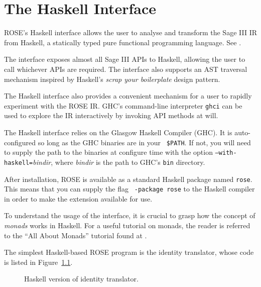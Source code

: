 \chapter{The Haskell Interface}

ROSE's Haskell interface allows the user to analyse and
transform the Sage III IR from Haskell, a statically typed pure
functional programming language.  See .

The interface exposes almost all Sage III APIs to Haskell, allowing
the user to call whichever APIs are required.  The interface also
supports an AST traversal mechanism inspired by Haskell's {\em scrap
your boilerplate} design pattern.

The Haskell interface also provides a convenient mechanism for a
user to rapidly experiment with the ROSE IR.  GHC's command-line
interpreter {\tt ghci} can be used to explore the IR interactively
by invoking API methods at will.

The Haskell interface relies on the Glasgow Haskell Compiler (GHC).
It is auto-configured so long as the GHC binaries are in your {\tt
\$PATH}.  If not, you will need to supply the path to the binaries
at configure time with the option {\tt --with-haskell=}{\em bindir},
where {\em bindir} is the path to GHC's {\tt bin} directory.

After installation, ROSE is available as a standard Haskell package
named {\tt rose}.  This means that you can supply the flag {\tt
-package rose} to the Haskell compiler in order to make the extension
available for use.

To understand the usage of the interface, it is
crucial to grasp how the concept of {\em monads} works
in Haskell.   For a useful tutorial on monads, the reader
is referred to the ``All About Monads'' tutorial found at
.

The simplest Haskell-based ROSE program is the identity translator,
whose code is listed in Figure~\ref{Tutorial:haskellIdentityTranslator}.

\begin{figure}[!h]
{\indent
{\mySmallFontSize

\begin{latexonly}
   
\end{latexonly}

\begin{htmlonly}
   
\end{htmlonly}

}
}
\caption{Haskell version of identity translator.}
\label{Tutorial:haskellIdentityTranslator}
\end{figure}

